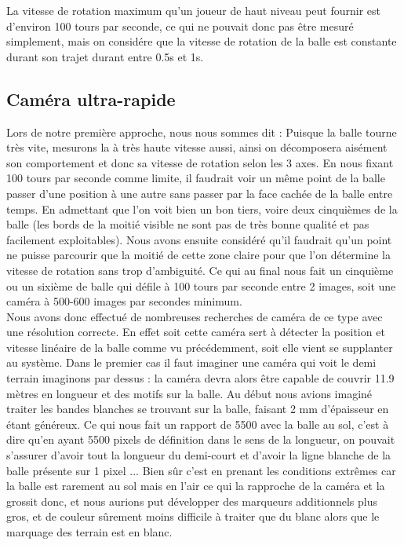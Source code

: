 La vitesse de rotation maximum qu'un joueur de haut niveau peut fournir est d'environ 100 tours par seconde, ce qui ne pouvait donc pas être mesuré simplement, mais on considére que la vitesse de rotation de la balle est constante durant son trajet durant entre 0.5s et 1s.

\subsection{Caméra ultra-rapide}

Lors de notre première approche, nous nous sommes dit : Puisque la balle tourne très vite, mesurons la à très haute vitesse aussi, ainsi on décomposera aisément son comportement et donc sa vitesse de rotation selon les 3 axes. En nous fixant 100 tours par seconde comme limite, il faudrait voir un même point de la balle passer d'une position à une autre sans passer par la face cachée de la balle entre temps. En admettant que l'on voit bien un bon tiers, voire deux cinquièmes de la balle (les bords de la moitié visible ne sont pas de très bonne qualité et pas facilement exploitables). Nous avons ensuite considéré qu'il faudrait qu'un point ne puisse parcourir que la moitié de cette zone claire pour que l'on détermine la vitesse de rotation sans trop d'ambiguité. Ce qui au final nous fait un cinquième ou un sixième de balle qui défile à 100 tours par seconde entre 2 images, soit une caméra à 500-600 images par secondes minimum.\\

Nous avons donc effectué de nombreuses recherches de caméra de ce type avec une résolution correcte. En effet soit cette caméra sert à détecter la position et vitesse linéaire de la balle comme vu précédemment, soit elle vient se supplanter au système. Dans le premier cas il faut imaginer une caméra qui voit le demi terrain imaginons par dessus : la caméra devra alors être capable de couvrir 11.9 mètres en longueur et des motifs sur la balle. Au début nous avions imaginé traiter les bandes blanches se trouvant sur la balle, faisant 2 mm d'épaisseur en étant généreux. Ce qui nous fait un rapport de 5500 avec la balle au sol, c'est à dire qu'en ayant 5500 pixels de définition dans le sens de la longueur, on pouvait s'assurer d'avoir tout la longueur du demi-court et d'avoir la ligne blanche de la balle présente sur 1 pixel ... Bien sûr c'est en prenant les conditions extrêmes car la balle est rarement au sol mais en l'air ce qui la rapproche de la caméra et la grossit donc, et nous aurions put développer des marqueurs additionnels plus gros, et de couleur sûrement moins difficile à traiter que du blanc alors que le marquage des terrain est en blanc.\\

